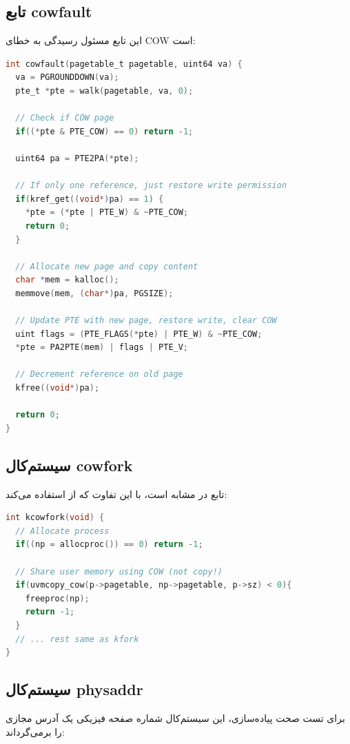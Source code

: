 \documentclass[12pt,a4paper]{article}
\begin{document}
\subsection{تابع cowfault}
این تابع مسئول رسیدگی به خطای COW است:

\begin{latin}
\begin{lstlisting}[language=C, caption={تابع cowfault}]
int cowfault(pagetable_t pagetable, uint64 va) {
  va = PGROUNDDOWN(va);
  pte_t *pte = walk(pagetable, va, 0);
  
  // Check if COW page
  if((*pte & PTE_COW) == 0) return -1;
  
  uint64 pa = PTE2PA(*pte);
  
  // If only one reference, just restore write permission
  if(kref_get((void*)pa) == 1) {
    *pte = (*pte | PTE_W) & ~PTE_COW;
    return 0;
  }
  
  // Allocate new page and copy content
  char *mem = kalloc();
  memmove(mem, (char*)pa, PGSIZE);
  
  // Update PTE with new page, restore write, clear COW
  uint flags = (PTE_FLAGS(*pte) | PTE_W) & ~PTE_COW;
  *pte = PA2PTE(mem) | flags | PTE_V;
  
  // Decrement reference on old page
  kfree((void*)pa);
  
  return 0;
}
\end{lstlisting}
\end{latin}

\subsection{سیستم‌کال cowfork}
تابع  در  مشابه  است، با این تفاوت که از  استفاده می‌کند:

\begin{latin}
\begin{lstlisting}[language=C, caption={تابع kcowfork}]
int kcowfork(void) {
  // Allocate process
  if((np = allocproc()) == 0) return -1;

  // Share user memory using COW (not copy!)
  if(uvmcopy_cow(p->pagetable, np->pagetable, p->sz) < 0){
    freeproc(np);
    return -1;
  }
  // ... rest same as kfork
}
\end{lstlisting}
\end{latin}

\subsection{سیستم‌کال physaddr}
برای تست صحت پیاده‌سازی، این سیستم‌کال شماره صفحه فیزیکی یک آدرس مجازی را برمی‌گرداند:
\end{document}
